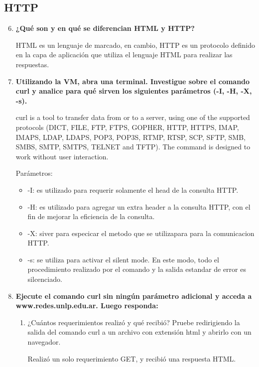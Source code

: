 \documentclass[a4paper,10pt]{article}
\begin{document}
\subsection{HTTP}
\begin{enumerate}
    \setcounter{enumi}{5}
    \item \textbf{¿Qué son y en qué se diferencian HTML y HTTP?}

    HTML es un lenguaje de marcado, en cambio, HTTP es un protocolo definido en la capa de aplicación que utiliza el lenguaje HTML para realizar las respuestas.

    \item \textbf{Utilizando la VM, abra una terminal. Investigue sobre el comando curl y analice para qué sirven los siguientes parámetros (-I, -H, -X, -s).}

    curl  is  a  tool  to  transfer  data from or to a server, using one of the supported protocols (DICT, FILE, FTP, FTPS, GOPHER, HTTP, HTTPS, IMAP, IMAPS, LDAP, LDAPS, POP3, POP3S, RTMP, RTSP, SCP,  SFTP,  SMB,  SMBS, SMTP, SMTPS, TELNET and TFTP). The command is designed to work without user interaction.

    Parámetros:
        \begin{itemize}
            \item -I: es utilizado para requerir solamente el head de la consulta HTTP.
            \item -H: es utilizado para agregar un extra header a la consulta HTTP, con el fin de mejorar la eficiencia de la consulta.
            \item -X: siver para especicar el metodo que se utilizapara para la comunicacion HTTP.
            \item -s: se utiliza para activar el silent mode. En este modo, todo el procedimiento realizado por el comando y la salida estandar de error es silcenciado.
        \end{itemize}

    \item \textbf{Ejecute el comando curl sin ningún parámetro adicional y acceda a www.redes.unlp.edu.ar.
    Luego responda:}

        \begin{enumerate}
            \item ¿Cuántos requerimientos realizó y qué recibió? Pruebe redirigiendo la salida del comando curl a un archivo con extensión html y abrirlo con un navegador.

            Realizó un solo requerimiento GET, y recibió una respuesta HTML.


\end{enumerate}
\end{enumerate}
\end{document}
